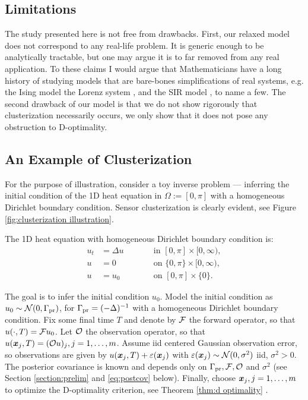 \subsection{Limitations}\label{subsec:limitations}
The study presented here is not free from drawbacks. First, our
relaxed model does not correspond to any real-life problem. It is
generic enough to be analytically tractable, but one may argue it is
to far removed from any real application. To these claims I would
argue that Mathematicians have a long history of studying models that
are bare-bones simplifications of real systems, e.g. the Ising model
\cite{cipra1987} the Lorenz system \cite{brin}, and the SIR model
\cite{keeling2008}, to name a few. The second drawback of our model is
that we do not show rigorously that clusterization necessarily occurs,
we only show that it does not pose any obstruction to D-optimality.


\subsection{An Example of Clusterization}\label{subsec:example}
For the purpose of illustration, consider a toy inverse problem ---
inferring the initial condition of the 1D heat equation in $\Omega :=
[0,\pi]$ with a homogeneous Dirichlet boundary condition. Sensor
clusterization is clearly evident, see Figure \ref{fig:clusterization
  illustration}.

The 1D heat equation with homogeneous Dirichlet boundary condition is:
\begin{subequations}\label{eq:heat equation}
  \begin{alignat}{2}
    u_t &= \Delta u &&\qquad \text{in } [0,\pi] \times [0,\infty),\\
      u &= 0 &&\qquad \text{on } \{0, \pi\} \times [0,\infty),\\
        u &= u_0 &&\qquad \text{on }[0,\pi] \times \{0\}.
  \end{alignat}
\end{subequations}


The goal is to infer the initial condition $u_0$. Model the initial
condition as $u_0 \sim \mathcal{N}(0,\Gamma_{\textup{pr}})$, for $\Gamma_{\textup{pr}} =
(-\Delta)^{-1}$ with a homogeneous Dirichlet boundary condition. Fix
some final time $T$ and denote by $\mathcal{F}$ the forward operator, so that
$u(\cdot, T) = \mathcal{F} u_0$. Let $\mathcal{O}$ the observation operator, so that
$u({\boldsymbol{x}}_j,T) = (\mathcal{O} u)_j, j=1,\dots,m$. Assume iid centered Gaussian
observation error, so observations are given by $u({\boldsymbol{x}}_j,T) +
\varepsilon({\boldsymbol{x}}_j)$ with $\varepsilon({\boldsymbol{x}}_j) \sim \mathcal{N}(0, \sigma^2)$ iid, $\sigma^2
> 0$. The posterior covariance is known and depends only on $\Gamma_{\textup{pr}},
\mathcal{F}, \mathcal{O}$ and $\sigma^2$ \cite{Stuart10} (see Section
\ref{section:prelim} and \eqref{eq:postcov} below). Finally, choose
${\boldsymbol{x}}_j,j=1,\dots,m$ to optimize the D-optimality criterion, see Theorem
\ref{thm:d optimality} \cite{AlexanderianGloorGhattas14}.

